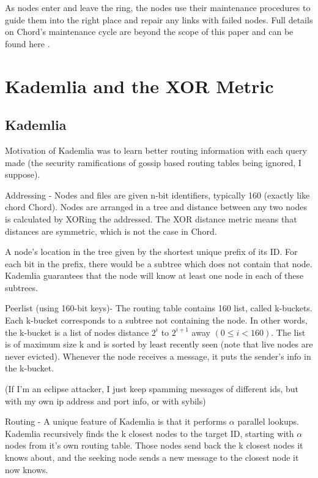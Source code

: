 \documentclass[10pt,letterpaper]{report}
\begin{document}
As nodes enter and leave the ring, the nodes use their maintenance procedures to guide them into the right place and repair any links with failed nodes.  Full details on Chord's maintenance cycle are beyond the scope of this paper and can be found here \cite{chord}.



\chapter{Kademlia and the XOR Metric}

\section{Kademlia}

\cite{kademlia}
Motivation of Kademlia was to learn better routing information with each query made (the security ramifications of gossip based routing tables being ignored, I suppose).

Addressing  -  Nodes and files are given n-bit identifiers, typically 160 (exactly like chord Chord).  Nodes are arranged in a tree and distance between any two nodes is calculated by XORing the addressed.  The XOR distance metric means that distances are symmetric, which is not the case in Chord.

A node's location in the tree given by the shortest unique prefix of its ID.   For each bit in the prefix, there would be a subtree which does not contain that node.  Kademlia guarantees that the node will know at least one node in each of these subtrees.


Peerlist  (using 160-bit keys)-  The routing table contains 160 list, called k-buckets.  Each k-bucket corresponds to a subtree not containing the node. In other words, the k-bucket is a list of nodes distance $2^i$ to $2^{i+1}$ away $(0 \leq i < 160)$.  The list is of maximum size k and is sorted by least recently seen  (note that live nodes are never evicted).  Whenever the node receives a message, it puts the sender's info in the k-bucket.  

(If I'm an eclipse attacker, I just keep spamming messages of different ids, but with my own ip address and port info, or with sybils)



Routing  -  A unique feature of Kademlia is that it performs $\alpha$ parallel lookups.    Kademlia recursively finds the k closest nodes to the target ID, starting with $\alpha$ nodes from it's own routing table.  Those nodes send back the k closest nodes it knows about, and the seeking node sends a new message to the closest node it now knows.
\end{document}

